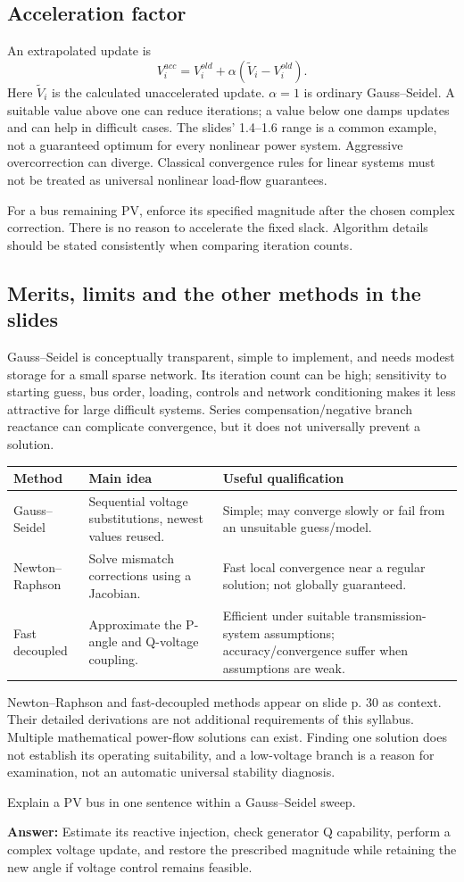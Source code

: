 \documentclass[11pt,a4paper]{article}
\newcommand{\checkq}[2]{\begin{tcolorbox}[breakable=false,colback=pale,colframe=teal,coltitle=white,title={Check your understanding}]#1\par\textbf{Answer:} #2\end{tcolorbox}}
\begin{document}
\subsection{Acceleration factor}
An extrapolated update is
\[
V_i^{acc}=V_i^{old}+\alpha(\widetilde V_i-V_i^{old}).
\]
Here $\widetilde V_i$ is the calculated unaccelerated update. $\alpha=1$ is ordinary Gauss--Seidel. A suitable value above one can reduce iterations; a value below one damps updates and can help in difficult cases. The slides' 1.4--1.6 range is a common example, not a guaranteed optimum for every nonlinear power system. Aggressive overcorrection can diverge. Classical convergence rules for linear systems must not be treated as universal nonlinear load-flow guarantees.

For a bus remaining PV, enforce its specified magnitude after the chosen complex correction. There is no reason to accelerate the fixed slack. Algorithm details should be stated consistently when comparing iteration counts.
\subsection{Merits, limits and the other methods in the slides}
Gauss--Seidel is conceptually transparent, simple to implement, and needs modest storage for a small sparse network. Its iteration count can be high; sensitivity to starting guess, bus order, loading, controls and network conditioning makes it less attractive for large difficult systems. Series compensation/negative branch reactance can complicate convergence, but it does not universally prevent a solution.
\begin{center}\small\begin{tabularx}{\textwidth}{L{.23\textwidth}Y Y}
\toprule Method & Main idea & Useful qualification\\\midrule
Gauss--Seidel & Sequential voltage substitutions, newest values reused. & Simple; may converge slowly or fail from an unsuitable guess/model.\\
Newton--Raphson & Solve mismatch corrections using a Jacobian. & Fast local convergence near a regular solution; not globally guaranteed.\\
Fast decoupled & Approximate the P-angle and Q-voltage coupling. & Efficient under suitable transmission-system assumptions; accuracy/convergence suffer when assumptions are weak.\\\bottomrule
\end{tabularx}\end{center}
Newton--Raphson and fast-decoupled methods appear on slide p. 30 as context. Their detailed derivations are not additional requirements of this syllabus. Multiple mathematical power-flow solutions can exist. Finding one solution does not establish its operating suitability, and a low-voltage branch is a reason for examination, not an automatic universal stability diagnosis.
\checkq{Explain a PV bus in one sentence within a Gauss--Seidel sweep.}{Estimate its reactive injection, check generator Q capability, perform a complex voltage update, and restore the prescribed magnitude while retaining the new angle if voltage control remains feasible.}
\end{document}
